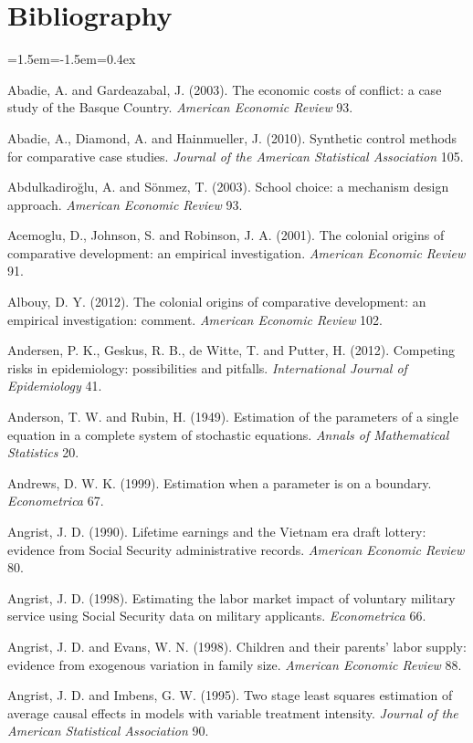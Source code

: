 \chapter*{Bibliography}
\small
\begin{list}{}{\leftmargin=1.5em\itemindent=-1.5em\itemsep=0.4ex}
\item Abadie, A. and Gardeazabal, J. (2003). The economic costs of conflict: a case study of the Basque Country. \emph{American Economic Review} 93.
\item Abadie, A., Diamond, A. and Hainmueller, J. (2010). Synthetic control methods for comparative case studies. \emph{Journal of the American Statistical Association} 105.
\item Abdulkadiro\u{g}lu, A. and S\"onmez, T. (2003). School choice: a mechanism design approach. \emph{American Economic Review} 93.
\item Acemoglu, D., Johnson, S. and Robinson, J. A. (2001). The colonial origins of comparative development: an empirical investigation. \emph{American Economic Review} 91.
\item Albouy, D. Y. (2012). The colonial origins of comparative development: an empirical investigation: comment. \emph{American Economic Review} 102.
\item Andersen, P. K., Geskus, R. B., de Witte, T. and Putter, H. (2012). Competing risks in epidemiology: possibilities and pitfalls. \emph{International Journal of Epidemiology} 41.
\item Anderson, T. W. and Rubin, H. (1949). Estimation of the parameters of a single equation in a complete system of stochastic equations. \emph{Annals of Mathematical Statistics} 20.
\item Andrews, D. W. K. (1999). Estimation when a parameter is on a boundary. \emph{Econometrica} 67.
\item Angrist, J. D. (1990). Lifetime earnings and the Vietnam era draft lottery: evidence from Social Security administrative records. \emph{American Economic Review} 80.
\item Angrist, J. D. (1998). Estimating the labor market impact of voluntary military service using Social Security data on military applicants. \emph{Econometrica} 66.
\item Angrist, J. D. and Evans, W. N. (1998). Children and their parents' labor supply: evidence from exogenous variation in family size. \emph{American Economic Review} 88.
\item Angrist, J. D. and Imbens, G. W. (1995). Two stage least squares estimation of average causal effects in models with variable treatment intensity. \emph{Journal of the American Statistical Association} 90.

\end{list}
